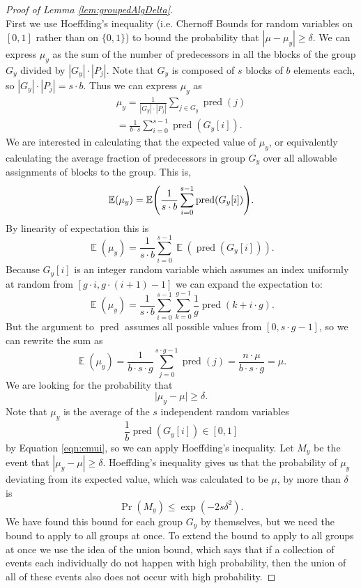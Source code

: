 \documentclass[twocolumn, twoside, 12pt]{article}
\def\pred{\operatorname{pred}}
\def\E{\operatorname{\mathbb{E}}}
\def\Pr{\operatorname{Pr}}
\DeclarePairedDelimiter{\paren}{(}{)}
\begin{document}
\begin{proof}[Proof of Lemma \ref{lem:groupedAlgDelta}]
$ $\\
First we use Hoeffding's inequality (i.e. Chernoff Bounds for random variables on $[0,1]$ rather than on $\{0,1\}$) to bound the probability that $|\mu - \mu_y| \geq \delta$. 
We can express $\mu_y$ as the sum of the number of predecessors in all the blocks of the group $G_y$ divided by $|G_y|\cdot|P_j|$.
Note that $G_y$ is composed of $s$ blocks of $b$ elements each, so $|G_y|\cdot|P_j| = s\cdot b$.
Thus we can express $\mu_y$ as \\
\begin{equation}
	\begin{split}
	\mu_y = \frac{1}{|G_y|\cdot|P_j|}\sum_{j \in G_y} \pred(j) \\
	= \frac{1}{b \cdot s}\sum_{i=0}^{s-1}\pred(G_y[i]).
	\end{split}
	\label{eqn:emui}
\end{equation}
We are interested in calculating that the expected value of $\mu_y$, or equivalently calculating the average fraction of predecessors in group $G_y$ over all allowable assignments of blocks to the group.
This is, 
$$\E(\mu_y) = \E\paren*{\frac{1}{s\cdot b} \sum_{i=0}^{s-1}\pred(G_y[i])}.$$
By linearity of expectation this is
$$\E(\mu_y) = \frac{1}{s\cdot b} \sum_{i=0}^{s-1}\E(\pred(G_y[i])).$$
Because $G_y[i]$ is an integer random variable which assumes an index uniformly at random from $[g \cdot i, g \cdot (i + 1) - 1]$ we can expand the expectation to:
$$\E(\mu_y) = \frac{1}{s\cdot b}\sum_{i=0}^{s-1}\sum_{k=0}^{g-1}\frac{1}{g}\pred(k+i\cdot g).$$
	But the argument to $\pred$ assumes all possible values from $[0, s\cdot g -1]$, so we can rewrite the sum as
$$\E(\mu_y) = \frac{1}{b\cdot s \cdot g}\sum_{j=0}^{s\cdot g-1}\pred(j) = \frac{n \cdot \mu}{b \cdot s \cdot g} = \mu.$$ 
We are looking for the probability that 
$$\Big | \mu_y - \mu \Big | \geq \delta.$$
	Note that $\mu_y$ is the average of the $s$ independent random variables $$\frac{1}{b}\pred(G_y[i]) \in [0, 1]$$ by Equation \eqref{eqn:emui}, so we can apply Hoeffding's inequality.
Let $M_y$ be the event that $|\mu_y-\mu| \geq \delta$. 
Hoeffding's inequality gives us that the probability of $\mu_y$ deviating from its expected value, which was calculated to be $\mu$, by more than $\delta$ is
	$$\Pr(M_y) \leq \exp(-2s\delta^2).$$
We have found this bound for each group $G_y$ by themselves, but we need the bound to apply to all groups at once. 
To extend the bound to apply to all groups at once we use the idea of the union bound, which says that if a collection of events each individually do not happen with high probability, then the union of all of these events also does not occur with high probability.

\end{proof}
\end{document}
